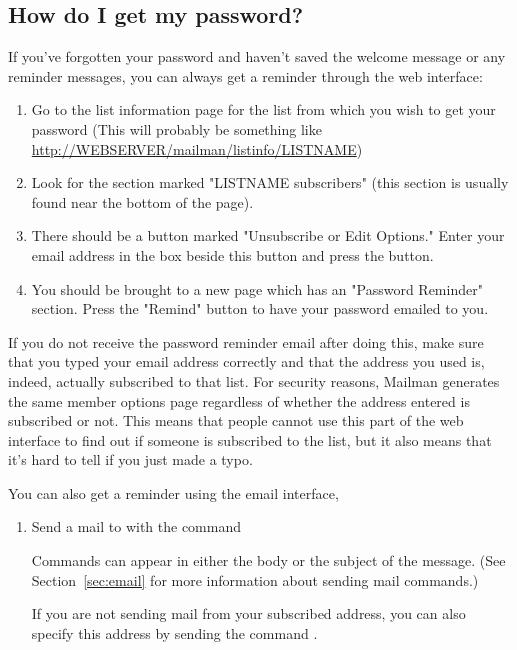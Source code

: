 \documentclass{howto}
\begin{document}

\subsection{How do I get my password?\label{sec:getpassword}}
If you've forgotten your password and haven't saved the welcome message or 
any reminder messages, you can always get a reminder through the web interface:

\begin{enumerate}
	\item Go to the list information page for the list from which you wish to 
	get your password
	(This will probably be something like 
	\url{http://WEBSERVER/mailman/listinfo/LISTNAME})
	\item Look for the section marked "LISTNAME subscribers" 
	(this section is usually found near the bottom of the page).
	\item There should be a button marked "Unsubscribe or Edit Options."  
	Enter your email address in the box beside this button and press the
	button.
	\item You should be brought to a new page which has an "Password 
	Reminder" section.  Press the "Remind" button to have your password
	emailed to you.
\end{enumerate}

If you do not receive the password reminder email after doing this, make sure 
that you typed your
email address correctly and that the address you used is, indeed, actually
subscribed to that list.  For security reasons, Mailman generates the same
member options page regardless of whether the address entered is subscribed
or not.  This means that people cannot use this part of the web interface to
find out if someone is subscribed to the list, but it also means that it's
hard to tell if you just made a typo.

You can also get a reminder using the email interface, 
\begin{enumerate}
	\item Send a mail to  with the command 

	Commands can appear
	in either the body or the subject of the message.  (See 
	Section~\ref{sec:email} for more information about sending mail
	commands.)  

	If you are not sending mail from your subscribed address, you can also
	specify this address by sending the command .
\end{enumerate}
\end{document}
